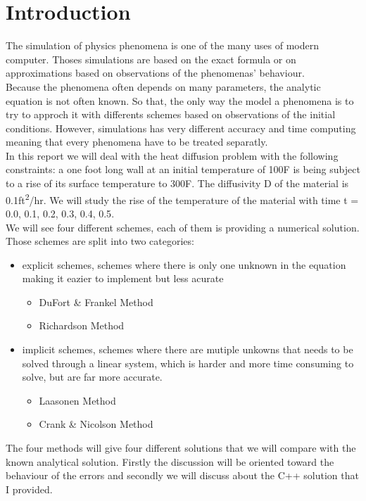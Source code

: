 \documentclass[12pt, a4paper]{report}
\begin{document}
\chapter*{Introduction}
The simulation of physics phenomena is one of the many uses of modern computer. Thoses simulations are based on the exact formula or on approximations based on observations of the phenomenas' behaviour.\\
Because the phenomena often depends on many parameters, the analytic equation is not often known. So that, the only way the model a phenomena is to try to approch it with differents schemes based on observations of the initial conditions. However, simulations has very different accuracy and time computing meaning that every phenomena have to be treated separatly.\\
In this report we will deal with the heat diffusion problem with the following constraints: a one foot long wall at an initial temperature of 100\degree F is being subject to a rise of its surface temperature to 300\degree F. The diffusivity D of the material is 0.1ft\textsuperscript{2}/hr. We will study the rise of the temperature of the material with time t = { 0.0, 0.1, 0.2, 0.3, 0.4, 0.5}.
\\
We will see four different schemes, each of them is providing a numerical solution. Those schemes are split into two categories:
\begin{itemize}

\item explicit schemes, schemes where there is only one unknown in the equation making it eazier to implement but less acurate
\begin{itemize}
\item DuFort \& Frankel Method
\item Richardson Method
\end{itemize}
\item implicit schemes, schemes where there are mutiple unkowns that needs to be solved through a linear system, which is harder and more time consuming to solve, but are far more accurate.
\begin{itemize}
\item Laasonen Method
\item Crank \& Nicolson Method
\end{itemize}
\end{itemize}

The four methods will give four different solutions that we will compare with the known analytical solution. Firstly the discussion will be oriented toward the behaviour of the errors and secondly we will discuss about the C++ solution that I provided.
\end{document}
